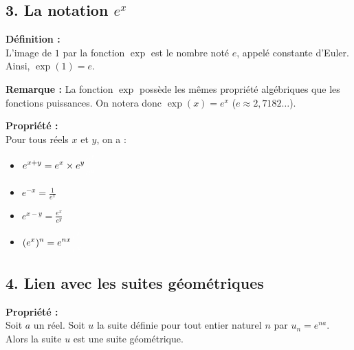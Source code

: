 \documentclass[11pt,a4paper]{article}
\begin{document}
\subsection*{3. La notation $e^x$}

\begin{mdframed}[style=definitionStyle]
    \textbf{Définition :} ~\\
    L'image de $1$ par la fonction $\exp$ est le nombre noté $e$, appelé constante d'Euler. \\
    Ainsi, $\exp(1)=e$.
\end{mdframed}

\textbf{Remarque :} La fonction $\exp$ possède les mêmes propriété algébriques que les fonctions puissances. On notera donc $\exp(x)=e^x$ ($e\approx2,7182\dots$).

\begin{mdframed}[style=proprieteStyle]
    \textbf{Propriété :} ~\\
    Pour tous réels $x$ et $y$, on a : \\

    \begin{minipage}{0.25\textwidth}
        \begin{itemize}
            \item $\displaystyle e^{x+y}=e^x\times e^y \color{white}\frac{e^x}{e^y}$ 
            \item $\displaystyle e^{-x}=\frac{1}{e^x}$
        \end{itemize}
    \end{minipage}
    \hfill
    \begin{minipage}{0.8\textwidth}
        \begin{itemize}
            \item $\displaystyle e^{x-y}=\frac{e^x}{e^y}$ 
            \item $\displaystyle (e^x)^n=e^{nx}\color{white}\frac{e^x}{e^y}$ 
        \end{itemize}
    \end{minipage}
\end{mdframed}

\newpage

\subsection*{4. Lien avec les suites géométriques}

\begin{mdframed}[style=proprieteStyle]
    \textbf{Propriété :} ~\\
    Soit $a$ un réel. Soit $u$ la suite définie pour tout entier naturel $n$ par $u_n=e^{na}$. \\
    Alors la suite $u$ est une suite géométrique.
\end{mdframed}
\end{document}
